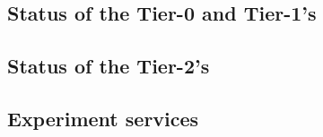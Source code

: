 \subsection {Status of the Tier-0 and Tier-1's}
\label{ssec-t1trans}


\subsection {Status of the Tier-2's}
\label{ssec-t2trans}


\subsection {Experiment services}
\label{ssec-exps}


